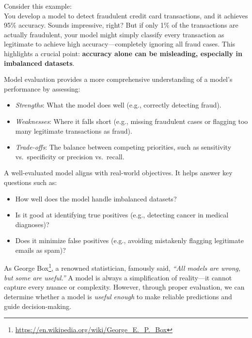 \documentclass[
  11pt,
]{book}
\providecommand{\tightlist}{%
  \setlength{\itemsep}{0pt}\setlength{\parskip}{0pt}}
\renewcommand{\href}[2]{#2\footnote{\url{#1}}}
\theoremstyle{definition}
\theoremstyle{definition}
\theoremstyle{definition}
\theoremstyle{definition}
\theoremstyle{remark}
\begin{document}
Consider this example:\\
You develop a model to detect fraudulent credit card transactions, and it achieves 95\% accuracy. Sounds impressive, right? But if only 1\% of the transactions are actually fraudulent, your model might simply classify every transaction as legitimate to achieve high accuracy---completely ignoring all fraud cases. This highlights a crucial point: \textbf{accuracy alone can be misleading, especially in imbalanced datasets}.

Model evaluation provides a more comprehensive understanding of a model's performance by assessing:

\begin{itemize}
\tightlist
\item
  \emph{Strengths}: What the model does well (e.g., correctly detecting fraud).\\
\item
  \emph{Weaknesses}: Where it falls short (e.g., missing fraudulent cases or flagging too many legitimate transactions as fraud).\\
\item
  \emph{Trade-offs}: The balance between competing priorities, such as sensitivity vs.~specificity or precision vs.~recall.
\end{itemize}

A well-evaluated model aligns with real-world objectives. It helps answer key questions such as:

\begin{itemize}
\tightlist
\item
  How well does the model handle imbalanced datasets?\\
\item
  Is it good at identifying true positives (e.g., detecting cancer in medical diagnoses)?\\
\item
  Does it minimize false positives (e.g., avoiding mistakenly flagging legitimate emails as spam)?
\end{itemize}

As \href{https://en.wikipedia.org/wiki/George_E._P._Box}{George Box}, a renowned statistician, famously said, \emph{``All models are wrong, but some are useful.''} A model is always a simplification of reality---it cannot capture every nuance or complexity. However, through proper evaluation, we can determine whether a model is \emph{useful enough} to make reliable predictions and guide decision-making.
\end{document}
